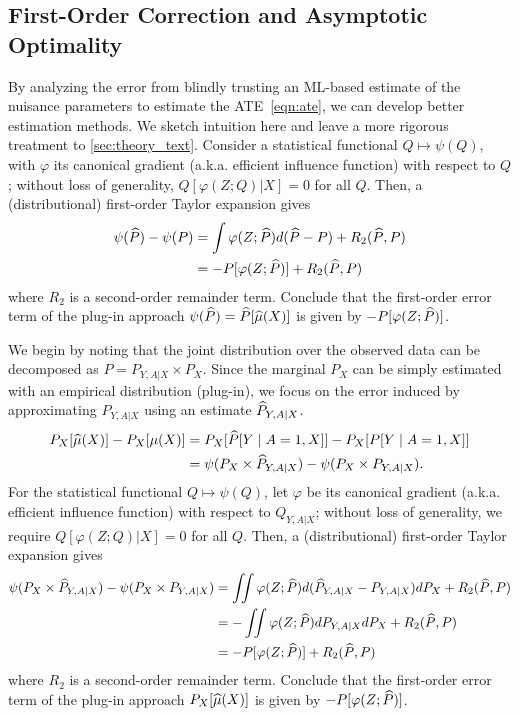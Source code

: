 \subsection{First-Order Correction and Asymptotic Optimality} 
\label{sec:optimality_background}
By analyzing the error from blindly trusting an ML-based estimate of the nuisance parameters to estimate the ATE~\eqref{eqn:ate}, we can develop better estimation methods. %
We sketch intuition here and leave a more rigorous treatment to \cref{sec:theory_text}. 
\ifdefined\pnas
    Consider a statistical functional $Q \mapsto \psi(Q)$, with $\varphi$ its canonical gradient (a.k.a. efficient influence function) 
    with respect to $Q$; 
    without loss of generality, $Q[\varphi(Z; Q) | X] =0$ for all $Q$. 
    Then, a (distributional) first-order Taylor expansion gives
    \begin{align}
        \psi(\widehat{P}) 
        -  \psi(P)
        & = \int \varphi(Z; \widehat{P}) d (\widehat{P} - P)  + R_2(\widehat{P}, P) \nonumber \\
        & = - P [ \varphi(Z; \widehat{P}) ] 
        + R_2(\widehat{P}, P)
        \label{eqn:taylor}
    \end{align}
    where $R_2$ is a second-order remainder term.
    Conclude that the first-order error term of the plug-in approach $\psi(\widehat{P})=\widehat{P}[\widehat{\mu}(X)]$ is given by $-P [ \varphi(Z; \widehat{P}) ]$.

\else
    We begin by noting that the joint distribution over the observed data can be decomposed as $P= P_{Y, A | X} \times P_X$.
    Since the marginal $P_X$ can be simply estimated with an empirical distribution (plug-in), we focus on the error induced by approximating $P_{Y, A | X}$ using an estimate 
    $\widehat{P}_{Y, A | X}$.
    \begin{align*}
        P_X[\widehat{\mu}(X)] - P_X [\mu(X)]
        & =     P_X [\widehat{P}[Y \mid A = 1, X]]
        - P_X [P[Y \mid A = 1, X]] \\
        & = \psi(P_X \times \widehat{P}_{Y, A | X}) - 
    \psi(P_X \times P_{Y, A | X}).
    \end{align*}
     For the statistical functional $Q \mapsto \psi(Q)$, let $\varphi$ be its canonical gradient (a.k.a. efficient influence function) 
    with respect to $Q_{Y, A|X}$; 
    without loss of generality, we require 
    $Q[\varphi(Z; Q) | X] =0$ for all $Q$. 
    Then, a (distributional) first-order Taylor expansion gives
    \begin{align}
        \psi(P_X \times \widehat{P}_{Y, A | X}) 
        -  \psi(P_X \times P_{Y, A | X})
        & = \iint \varphi(Z; \widehat{P}) d (\widehat{P}_{Y, A|X} - P_{Y, A|X}) dP_X + R_2(\widehat{P}, P) \nonumber \\
        & = - \iint \varphi(Z; \widehat{P}) dP_{Y, A|X} dP_X + R_2(\widehat{P}, P) \nonumber \\
        & = - P [ \varphi(Z; \widehat{P}) ] 
        + R_2(\widehat{P}, P)
        \label{eqn:taylor}
    \end{align}
    where $R_2$ is a second-order remainder term.
    Conclude that the first-order error term of the plug-in approach $P_X[\widehat{\mu}(X)]$ is given by $-P [ \varphi(Z; \widehat{P}) ]$.
\fi

